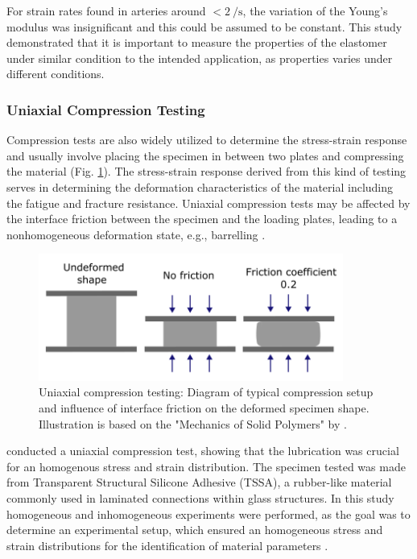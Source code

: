 For strain rates found in arteries around $<\SI[per-mode = symbol]{2}{\per \second}$, the variation of the
Young's modulus was insignificant and this could be assumed to be constant. This study demonstrated 
that it is important to measure the properties of the elastomer under similar condition to the
intended application, as properties varies under different conditions.

\subsubsection*{Uniaxial Compression Testing}
Compression tests are also widely utilized to determine the stress-strain response and 
usually involve placing the specimen in between two plates and compressing the material (Fig. \ref{fig:compressiondiag}).
The stress-strain response derived from this kind of testing serves in determining the deformation 
characteristics of the material including the fatigue and fracture resistance. 
Uniaxial compression tests may be affected by the interface friction between the specimen and 
the loading plates, leading to a nonhomogeneous deformation state, e.g., barrelling \cite{Bergström2015}.\\

\begin{figure}%
        \centering
       \quad
       \includegraphics[width=10cm]{Images/chapter1/compressiondiag.png}%
       \caption[Uniaxial compression testing setup]{Uniaxial compression testing: Diagram of typical compression setup and influence of interface friction on the deformed specimen shape. Illustration is based on the "Mechanics of Solid Polymers" by \citet{Bergström2015}.}%
       \label{fig:compressiondiag}%
\end{figure}

\citet{Drass2018} conducted a uniaxial compression test, showing that the lubrication was 
crucial for an homogenous stress and strain distribution. The specimen tested was made from Transparent Structural 
Silicone Adhesive (TSSA), a rubber-like material commonly used in laminated connections within glass structures.
In this study homogeneous and inhomogeneous experiments were performed, as the goal was to determine an 
experimental setup, which ensured an homogeneous stress and strain distributions for the identification of material parameters \cite{Drass2018}.

